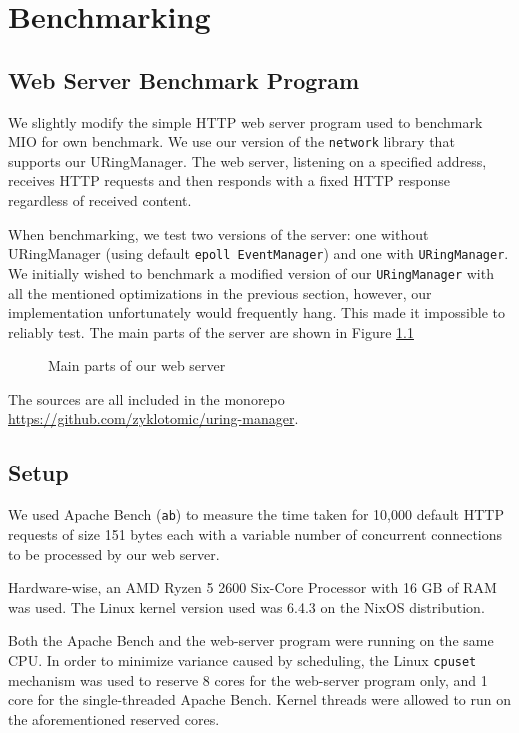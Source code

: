 \chapter{Benchmarking}
\section{Web Server Benchmark Program}
We slightly modify the simple HTTP web server program
used to benchmark MIO \cite{mio} for own benchmark.
We use our version of the \texttt{network} library that supports our URingManager. The web server, listening on a specified address, receives HTTP requests and then responds with a fixed HTTP response regardless of received content.

When benchmarking, we test two versions of the server: one without URingManager (using default \texttt{epoll EventManager}) and one with \texttt{URingManager}. We initially wished to benchmark a modified version of our \texttt{URingManager} with all the mentioned optimizations in the previous section, however, our implementation unfortunately would frequently hang. This made it impossible to reliably test. 
The main parts of the server are shown in Figure \ref{fig:WebServer}

\begin{figure}[ht]
    \centering
	
	\caption[Benchmarked Web Server Source]{Main parts of our web server}
	\label{fig:WebServer}
\end{figure} 

The sources are all included in the monorepo \url{https://github.com/zyklotomic/uring-manager}.

\section{Setup} 
We used Apache Bench (\texttt{ab}) to measure the time taken for 10,000  default HTTP requests of size 151 bytes each with a variable number of concurrent connections to be processed by our web server.

Hardware-wise, an AMD Ryzen 5 2600 Six-Core Processor with 16 GB of RAM was used. The Linux kernel version used was 6.4.3 on the NixOS distribution.

Both the Apache Bench and the web-server program were running on the same CPU. In order to minimize variance caused by scheduling, the Linux \texttt{cpuset} mechanism was used to reserve 8 cores for the web-server program only, and 1 core for the single-threaded Apache Bench. Kernel threads were allowed to run on the aforementioned reserved cores.

